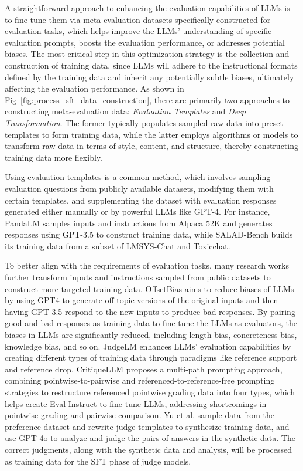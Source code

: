 A straightforward approach to enhancing the evaluation capabilities of LLMs is to fine-tune them via meta-evaluation datasets specifically constructed for evaluation tasks, which helps improve the LLMs' understanding of specific evaluation prompts, boosts the evaluation performance, or addresses potential biases. The most critical step in this optimization strategy is the collection and construction of training data, 
since LLMs will adhere to the instructional formats defined by the training data and inherit any potentially subtle biases, ultimately affecting the evaluation performance.
As shown in Fig~\ref{fig:process_sft_data_construction}, there are primarily two approaches to constructing meta-evaluation data: \textit{Evaluation Templates} and \textit{Deep Transformation}. The former typically populates sampled raw data into preset templates to form training data, while the latter employs algorithms or models to transform raw data in terms of style, content, and structure, thereby constructing training data more flexibly.

Using evaluation templates is a common method, which involves sampling evaluation questions from publicly available datasets, modifying them with certain templates, and supplementing the dataset with evaluation responses generated either manually or by powerful LLMs like GPT-4. For instance, PandaLM\cite{wang2023pandalm} samples inputs and instructions from Alpaca 52K\cite{alpaca} and generates responses using GPT-3.5 to construct training data, while SALAD-Bench\cite{salad_bench} builds its training data from a subset of LMSYS-Chat\cite{zheng2023lmsys} and Toxicchat\cite{lin2023toxicchat}. 

To better align with the requirements of evaluation tasks, many research works further transform inputs and instructions sampled from public datasets to construct more targeted training data. OffsetBias\cite{offsetbias} aims to reduce biases of LLMs by using GPT4 to generate off-topic versions of the original inputs and then having GPT-3.5 respond to the new inputs to produce bad responses. By pairing good and bad responses as training data to fine-tune the LLMs as evaluators, the biases in LLMs are significantly reduced, including length bias, concreteness bias, knowledge bias, and so on. JudgeLM\cite{zhu2023judgelm} enhances LLMs' evaluation capabilities by creating different types of training data through paradigms like reference support and reference drop. CritiqueLLM\cite{ke2024critiquellm} proposes a multi-path prompting approach, combining pointwise-to-pairwise and referenced-to-reference-free prompting strategies to restructure referenced pointwise grading data into four types, which helps create Eval-Instruct to fine-tune LLMs, addressing shortcomings in pointwise grading and pairwise comparison. Yu et al.\cite{yu2025improve} sample data from the preference dataset and rewrite judge templates to synthesize training data, and use GPT-4o to analyze and judge the pairs of answers in the synthetic data. The correct judgments, along with the synthetic data and analysis, will be processed as training data for the SFT phase of judge models.

